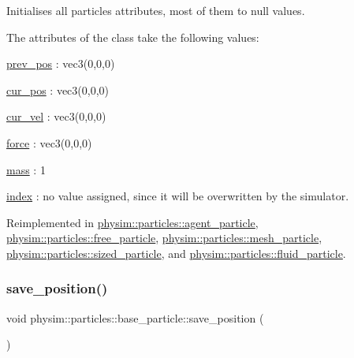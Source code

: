 Initialises all particle\textquotesingle{}s attributes, most of them to null values. 

The attributes of the class take the following values\+:
\begin{DoxyItemize}
\item \hyperlink{classphysim_1_1particles_1_1base__particle_a08072db6a1a59d21acc9cac6ac8965f7}{prev\+\_\+pos} \+: vec3(0,0,0)
\item \hyperlink{classphysim_1_1particles_1_1base__particle_a6298a121dea043741e5d3722386163c6}{cur\+\_\+pos} \+: vec3(0,0,0)
\item \hyperlink{classphysim_1_1particles_1_1base__particle_a66a164d2a130c40901e3ec2709cdad43}{cur\+\_\+vel} \+: vec3(0,0,0)
\item \hyperlink{classphysim_1_1particles_1_1base__particle_adc3b11899d2e50970ae5d4931721a0ef}{force} \+: vec3(0,0,0)
\item \hyperlink{classphysim_1_1particles_1_1base__particle_acb5c9f0b4a911d8981210e2cfc4dda8a}{mass} \+: 1
\item \hyperlink{classphysim_1_1particles_1_1base__particle_a44f5de3bb4b860dfd511e28e1d6519d5}{index} \+: no value assigned, since it will be overwritten by the simulator. 
\end{DoxyItemize}

Reimplemented in \hyperlink{classphysim_1_1particles_1_1agent__particle_ac13082909f480fc55d406321c77d38b1}{physim\+::particles\+::agent\+\_\+particle}, \hyperlink{classphysim_1_1particles_1_1free__particle_a0df21e64a28c5fdf471d54a50b59fea3}{physim\+::particles\+::free\+\_\+particle}, \hyperlink{classphysim_1_1particles_1_1mesh__particle_a1b3c3eac1e62296c2facd8c9d9b84608}{physim\+::particles\+::mesh\+\_\+particle}, \hyperlink{classphysim_1_1particles_1_1sized__particle_a63de84961417c1522c0ca576697cd972}{physim\+::particles\+::sized\+\_\+particle}, and \hyperlink{classphysim_1_1particles_1_1fluid__particle_a0aa522f9400bcb02373edd7bb073249b}{physim\+::particles\+::fluid\+\_\+particle}.

\mbox{\label{classphysim_1_1particles_1_1base__particle_aee1ed4e0daca8db01c3a8f150fcdbbb1}} 
\subsubsection{\texorpdfstring{save\+\_\+position()}{save\_position()}}
{\footnotesize\ttfamily void physim\+::particles\+::base\+\_\+particle\+::save\+\_\+position (\begin{DoxyParamCaption}{ }\end{DoxyParamCaption})}



